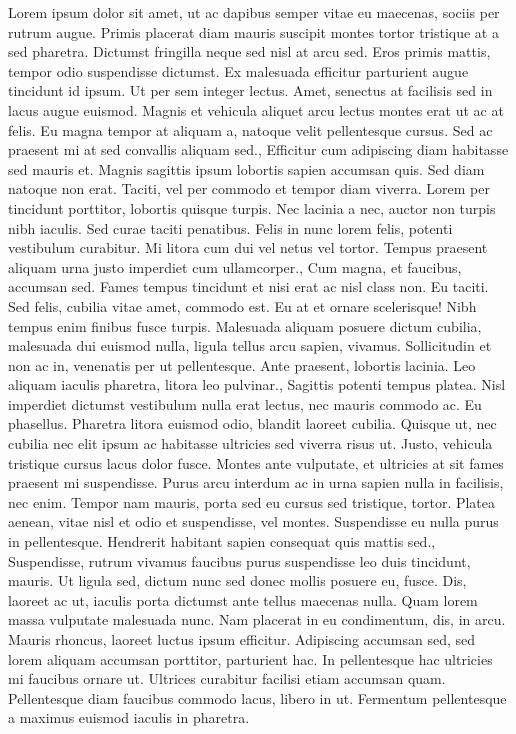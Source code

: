 \documentclass{source/tex/templates/maththesis}
\begin{document}
Lorem ipsum dolor sit amet, ut ac dapibus semper vitae eu maecenas, sociis per rutrum augue. Primis placerat diam mauris suscipit montes tortor tristique at a sed pharetra. Dictumst fringilla neque sed nisl at arcu sed. Eros primis mattis, tempor odio suspendisse dictumst. Ex malesuada efficitur parturient augue tincidunt id ipsum. Ut per sem integer lectus. Amet, senectus at facilisis sed in lacus augue euismod. Magnis et vehicula aliquet arcu lectus montes erat ut ac at felis. Eu magna tempor at aliquam a, natoque velit pellentesque cursus. Sed ac praesent mi at sed convallis aliquam sed., Efficitur cum adipiscing diam habitasse sed mauris et. Magnis sagittis ipsum lobortis sapien accumsan quis. Sed diam natoque non erat. Taciti, vel per commodo et tempor diam viverra. Lorem per tincidunt porttitor, lobortis quisque turpis. Nec lacinia a nec, auctor non turpis nibh iaculis. Sed curae taciti penatibus. Felis in nunc lorem felis, potenti vestibulum curabitur. Mi litora cum dui vel netus vel tortor. Tempus praesent aliquam urna justo imperdiet cum ullamcorper., Cum magna, et faucibus, accumsan sed. Fames tempus tincidunt et nisi erat ac nisl class non. Eu taciti. Sed felis, cubilia vitae amet, commodo est. Eu at et ornare scelerisque! Nibh tempus enim finibus fusce turpis. Malesuada aliquam posuere dictum cubilia, malesuada dui euismod nulla, ligula tellus arcu sapien, vivamus. Sollicitudin et non ac in, venenatis per ut pellentesque. Ante praesent, lobortis lacinia. Leo aliquam iaculis pharetra, litora leo pulvinar., Sagittis potenti tempus platea. Nisl imperdiet dictumst vestibulum nulla erat lectus, nec mauris commodo ac. Eu phasellus. Pharetra litora euismod odio, blandit laoreet cubilia. Quisque ut, nec cubilia nec elit ipsum ac habitasse ultricies sed viverra risus ut. Justo, vehicula tristique cursus lacus dolor fusce. Montes ante vulputate, et ultricies at sit fames praesent mi suspendisse. Purus arcu interdum ac in urna sapien nulla in facilisis, nec enim. Tempor nam mauris, porta sed eu cursus sed tristique, tortor. Platea aenean, vitae nisl et odio et suspendisse, vel montes. Suspendisse eu nulla purus in pellentesque. Hendrerit habitant sapien consequat quis mattis sed., Suspendisse, rutrum vivamus faucibus purus suspendisse leo duis tincidunt, mauris. Ut ligula sed, dictum nunc sed donec mollis posuere eu, fusce. Dis, laoreet ac ut, iaculis porta dictumst ante tellus maecenas nulla. Quam lorem massa vulputate malesuada nunc. Nam placerat in eu condimentum, dis, in arcu. Mauris rhoncus, laoreet luctus ipsum efficitur. Adipiscing accumsan sed, sed lorem aliquam accumsan porttitor, parturient hac. In pellentesque hac ultricies mi faucibus ornare ut. Ultrices curabitur facilisi etiam accumsan quam. Pellentesque diam faucibus commodo lacus, libero in ut. Fermentum pellentesque a maximus euismod iaculis in pharetra.
\end{document}
